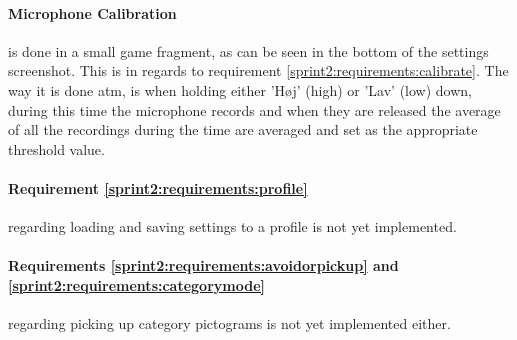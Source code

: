 \paragraph{Microphone Calibration} is done in a small game fragment, as can be seen in the bottom of the settings screenshot.
This is in regards to requirement \ref{sprint2:requirements:calibrate}.
The way it is done atm, is when holding either 'H\o j' (high) or 'Lav' (low) down, during this time the microphone records and when they are released the average of all the recordings during the time are averaged and set as the appropriate threshold value.


\paragraph{Requirement \ref{sprint2:requirements:profile}} regarding loading and saving settings to a profile is not yet implemented.

\paragraph{Requirements \ref{sprint2:requirements:avoidorpickup} and \ref{sprint2:requirements:categorymode}} regarding picking up category pictograms is not yet implemented either.